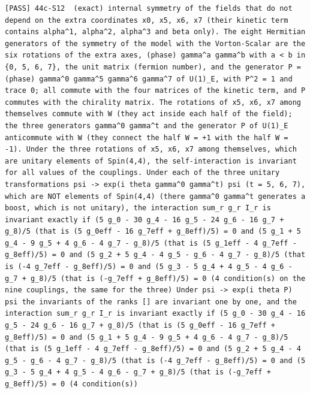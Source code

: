 \documentclass[
  10pt,
]{article}
\begin{document}
\begin{verbatim}
[PASS] 44c-S12  (exact) internal symmetry of the fields that do not depend on the extra coordinates x0, x5, x6, x7 (their kinetic term contains alpha^1, alpha^2, alpha^3 and beta only). The eight Hermitian generators of the symmetry of the model with the Vorton-Scalar are the six rotations of the extra axes, (phase) gamma^a gamma^b with a < b in {0, 5, 6, 7}, the unit matrix (fermion number), and the generator P = (phase) gamma^0 gamma^5 gamma^6 gamma^7 of U(1)_E, with P^2 = 1 and trace 0; all commute with the four matrices of the kinetic term, and P commutes with the chirality matrix. The rotations of x5, x6, x7 among themselves commute with W (they act inside each half of the field); the three generators gamma^0 gamma^t and the generator P of U(1)_E anticommute with W (they connect the half W = +1 with the half W = -1). Under the three rotations of x5, x6, x7 among themselves, which are unitary elements of Spin(4,4), the self-interaction is invariant for all values of the couplings. Under each of the three unitary transformations psi -> exp(i theta gamma^0 gamma^t) psi (t = 5, 6, 7), which are NOT elements of Spin(4,4) (there gamma^0 gamma^t generates a boost, which is not unitary), the interaction sum_r g_r I_r is invariant exactly if (5 g_0 - 30 g_4 - 16 g_5 - 24 g_6 - 16 g_7 + g_8)/5 (that is (5 g_0eff - 16 g_7eff + g_8eff)/5) = 0 and (5 g_1 + 5 g_4 - 9 g_5 + 4 g_6 - 4 g_7 - g_8)/5 (that is (5 g_1eff - 4 g_7eff - g_8eff)/5) = 0 and (5 g_2 + 5 g_4 - 4 g_5 - g_6 - 4 g_7 - g_8)/5 (that is (-4 g_7eff - g_8eff)/5) = 0 and (5 g_3 - 5 g_4 + 4 g_5 - 4 g_6 - g_7 + g_8)/5 (that is (-g_7eff + g_8eff)/5) = 0 (4 condition(s) on the nine couplings, the same for the three) Under psi -> exp(i theta P) psi the invariants of the ranks [] are invariant one by one, and the
interaction sum_r g_r I_r is invariant exactly if (5 g_0 - 30 g_4 - 16 g_5 - 24 g_6 - 16 g_7 + g_8)/5 (that is (5 g_0eff - 16 g_7eff + g_8eff)/5) = 0 and (5 g_1 + 5 g_4 - 9 g_5 + 4 g_6 - 4 g_7 - g_8)/5 (that is (5 g_1eff - 4 g_7eff - g_8eff)/5) = 0 and (5 g_2 + 5 g_4 - 4 g_5 - g_6 - 4 g_7 - g_8)/5 (that is (-4 g_7eff - g_8eff)/5) = 0 and (5 g_3 - 5 g_4 + 4 g_5 - 4 g_6 - g_7 + g_8)/5 (that is (-g_7eff + g_8eff)/5) = 0 (4 condition(s))

\end{verbatim}
\end{document}
